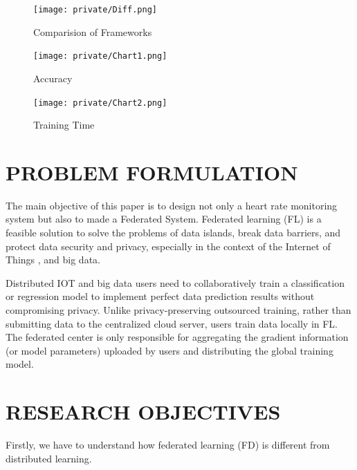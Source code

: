 \documentclass[14pt]{extarticle}
\begin{document}
\begin{figure}[!h]
    \centering
    \texttt{[image: private/Diff.png]}
    \caption{Comparision of Frameworks}
    \label{fig:comp}
\end{figure}

\begin{figure}[!h]
    \centering
    \texttt{[image: private/Chart1.png]}
    \caption{Accuracy}
    \label{fig:acc}
\end{figure}

\begin{figure}[!h]
    \centering
    \texttt{[image: private/Chart2.png]}
    \caption{Training Time}
    \label{fig:time}
\end{figure}


\newpage
\section{PROBLEM FORMULATION}

\par The main objective of this paper  is to design not only a heart rate monitoring system but also to made a Federated System. Federated learning (FL) is a feasible solution to solve the problems of data islands, break data barriers, and protect data security and privacy, especially in the context of the Internet of Things , and big data.

\par Distributed IOT and big data users need to collaboratively train a classification or regression model to implement perfect data prediction results without compromising privacy. Unlike privacy-preserving outsourced training, rather than submitting data to the centralized cloud server, users train data locally in FL. The federated center is only responsible for aggregating the gradient information (or model parameters) uploaded by users and distributing the global training model.

\newpage
\section{RESEARCH OBJECTIVES}

\par Firstly, we have to understand how federated learning (FD) is different from distributed learning.
\end{document}
